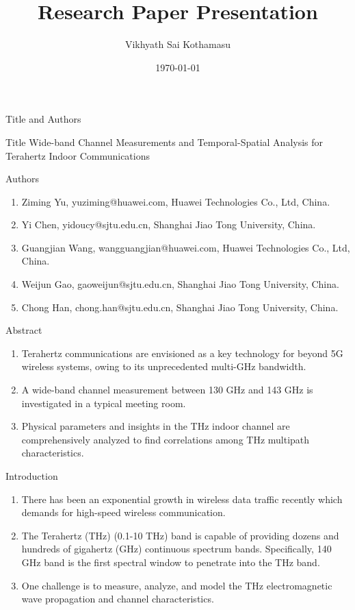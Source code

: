 \documentclass{beamer}
\title{Research Paper Presentation}
\author{Vikhyath Sai Kothamasu}
\institute{IITH}
\date{\today}
\begin{document}
\begin{frame}
\titlepage
\end{frame}
\begin{frame}{Title and Authors}
\begin{block}{Title}
Wide-band Channel Measurements and
Temporal-Spatial Analysis for Terahertz Indoor
Communications
\end{block}
\begin{block}{Authors}
\begin{enumerate}
    \item Ziming Yu, yuziming@huawei.com, Huawei Technologies Co., Ltd, China.
    \item Yi Chen, yidoucy@sjtu.edu.cn, Shanghai Jiao Tong University, China. 
    \item Guangjian Wang, wangguangjian@huawei.com, Huawei Technologies Co., Ltd, China.
    \item Weijun Gao, gaoweijun@sjtu.edu.cn, Shanghai Jiao Tong University, China. 
    \item Chong Han, chong.han@sjtu.edu.cn, Shanghai Jiao Tong University, China. 
\end{enumerate}
\end{block}
\end{frame}
\begin{frame}{Abstract}
\begin{enumerate}
    \item Terahertz communications are envisioned as a key technology for beyond 5G wireless systems, owing to its unprecedented multi-GHz bandwidth.
    \item A wide-band channel measurement between 130 GHz and 143 GHz is investigated in a typical meeting room.
    \item Physical parameters and insights in the THz indoor channel are comprehensively analyzed to find correlations among THz multipath
    characteristics.
\end{enumerate}
\end{frame}
\begin{frame}{Introduction}
\begin{enumerate}
    \item There has been an exponential growth in wireless data traffic recently which demands for high-speed wireless communication.
    \item The Terahertz (THz) (0.1-10 THz) band is capable of providing dozens and hundreds of gigahertz (GHz) continuous spectrum bands. Specifically, 140 GHz band is the first spectral window to penetrate into the THz band.
    \item One challenge is to measure, analyze, and model the THz electromagnetic wave propagation and channel characteristics.
\end{enumerate}
\end{frame}
\end{document}
